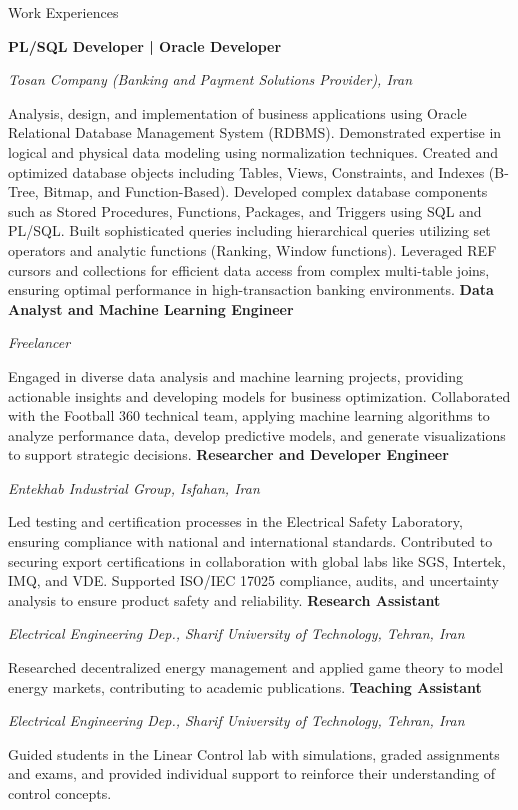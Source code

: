 \begin{rubric}{Work Experiences}

%
	\textbf{PL/SQL Developer | Oracle Developer} 
    \par \emph{Tosan Company (Banking and Payment Solutions Provider), Iran}
    \par Analysis, design, and implementation of business applications using Oracle Relational Database Management System (RDBMS). Demonstrated expertise in logical and physical data modeling using normalization techniques. Created and optimized database objects including Tables, Views, Constraints, and Indexes (B-Tree, Bitmap, and Function-Based). Developed complex database components such as Stored Procedures, Functions, Packages, and Triggers using SQL and PL/SQL. Built sophisticated queries including hierarchical queries utilizing set operators and analytic functions (Ranking, Window functions). Leveraged REF cursors and collections for efficient data access from complex multi-table joins, ensuring optimal performance in high-transaction banking environments.
%
%
	\textbf{Data Analyst and Machine Learning Engineer} 
    \par \emph{Freelancer}
    \par Engaged in diverse data analysis and machine learning projects, providing actionable insights and developing models for business optimization. Collaborated with the Football 360 technical team, applying machine learning algorithms to analyze performance data, develop predictive models, and generate visualizations to support strategic decisions.
%
%
	\textbf{Researcher and Developer Engineer } 
    \par \emph{Entekhab Industrial Group, Isfahan, Iran}
    \par Led testing and certification processes in the Electrical Safety Laboratory, ensuring compliance with national and international standards. Contributed to securing export certifications in collaboration with global labs like SGS, Intertek, IMQ, and VDE. Supported ISO/IEC 17025 compliance, audits, and uncertainty analysis to ensure product safety and reliability.
%
%
	\textbf{Research Assistant} 
    \par \emph{Electrical Engineering Dep., Sharif University of Technology, Tehran, Iran}
    \par Researched decentralized energy management and applied game theory to model energy markets, contributing to academic publications.
%
%
	\textbf{Teaching Assistant}
    \par \emph{Electrical Engineering Dep., Sharif University of Technology, Tehran, Iran}
    \par Guided students in the Linear Control lab with simulations, graded assignments and exams, and provided individual support to reinforce their understanding of control concepts.
\end{rubric}